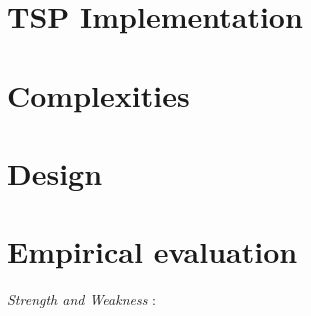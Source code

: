 \documentclass[12pt]{article}
\begin{document}
\section{TSP Implementation}










\section{Complexities}

\section{Design}
\section{Empirical evaluation}
\textit{Strength and Weakness} : \\
\end{document}
